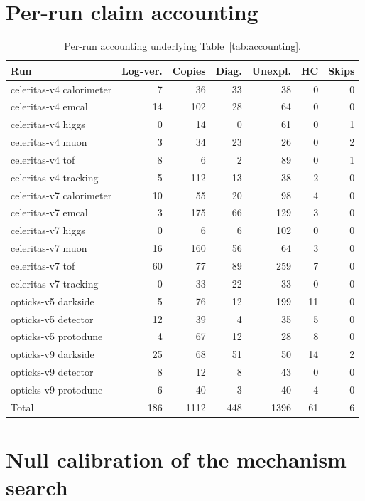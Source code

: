 \documentclass{article}
\begin{document}
\section{Per-run claim accounting}
\label{app:perrun}
\begin{table}[H]
\centering
\footnotesize
\caption{Per-run accounting underlying Table~\ref{tab:accounting}.}
\begin{tabular}{lrrrrrr}
\toprule
Run & Log-ver. & Copies & Diag. & Unexpl. & HC & Skips \\
\midrule
celeritas-v4 calorimeter & 7 & 36 & 33 & 38 & 0 & 0 \\
celeritas-v4 emcal & 14 & 102 & 28 & 64 & 0 & 0 \\
celeritas-v4 higgs & 0 & 14 & 0 & 61 & 0 & 1 \\
celeritas-v4 muon & 3 & 34 & 23 & 26 & 0 & 2 \\
celeritas-v4 tof & 8 & 6 & 2 & 89 & 0 & 1 \\
celeritas-v4 tracking & 5 & 112 & 13 & 38 & 2 & 0 \\
celeritas-v7 calorimeter & 10 & 55 & 20 & 98 & 4 & 0 \\
celeritas-v7 emcal & 3 & 175 & 66 & 129 & 3 & 0 \\
celeritas-v7 higgs & 0 & 6 & 6 & 102 & 0 & 0 \\
celeritas-v7 muon & 16 & 160 & 56 & 64 & 3 & 0 \\
celeritas-v7 tof & 60 & 77 & 89 & 259 & 7 & 0 \\
celeritas-v7 tracking & 0 & 33 & 22 & 33 & 0 & 0 \\
opticks-v5 darkside & 5 & 76 & 12 & 199 & 11 & 0 \\
opticks-v5 detector & 12 & 39 & 4 & 35 & 5 & 0 \\
opticks-v5 protodune & 4 & 67 & 12 & 28 & 8 & 0 \\
opticks-v9 darkside & 25 & 68 & 51 & 50 & 14 & 2 \\
opticks-v9 detector & 8 & 12 & 8 & 43 & 0 & 0 \\
opticks-v9 protodune & 6 & 40 & 3 & 40 & 4 & 0 \\
\midrule
Total & 186 & 1112 & 448 & 1396 & 61 & 6 \\
\bottomrule
\end{tabular}
\end{table}

\section{Null calibration of the mechanism search}
\label{app:nullcal}
\end{document}
